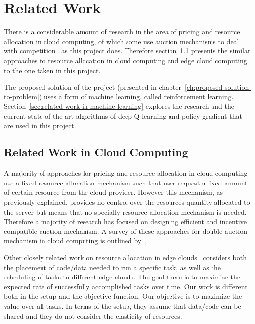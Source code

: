 \chapter{Related Work}\label{ch:background-literature}
There is a considerable amount of research in the area of pricing and resource allocation in cloud computing,
of which some use auction mechanisms to deal with competition~\citep{KUMAR2017234,Zhang2017,Du2019,Bi2019} as this
project does. Therefore section~\ref{sec:related-work-in-cloud-computing} presents the similar approaches to
resource allocation in cloud computing and edge cloud computing to the one taken in this project.

The proposed solution of the project (presented in chapter~\ref{ch:proposed-solution-to-problem}) uses a form of
machine learning, called reinforcement learning. Section~\ref{sec:related-work-in-machine-learning} explores the
research and the current state of the art algorithms of deep Q learning and policy gradient that are used in this
project.

\section{Related Work in Cloud Computing}\label{sec:related-work-in-cloud-computing}
A majority of approaches for pricing and resource allocation in cloud computing use a fixed resource allocation
mechanism such that user request a fixed amount of certain resource from the cloud provider. However this mechanism,
as previously explained, provides no control over the resources quantity allocated to the server but means that no
specially resource allocation mechanism is needed. Therefore a majority of research has focused on designing efficient
and incentive compatible auction mechanism. A survey of these approaches for double auction mechanism in cloud computing
is outlined by~\cite{KUMAR2017234},
\citep{KUMAR2017234,Zhang2017,Du2019,Bi2019}.

Other closely related work on resource allocation in edge clouds~\cite{vaji_infocom} considers both the placement of
code/data needed to run a specific task, as well as the scheduling of tasks to different edge clouds. The goal there
is to maximize the expected rate of successfully accomplished tasks over time. Our work is different both in the setup
and the objective function. Our objective is to maximize the value over all tasks. In terms of the setup, they assume
that data/code can be shared and they do not consider the elasticity of resources.

